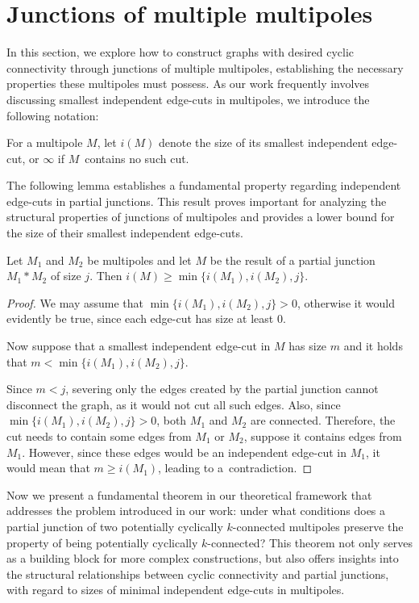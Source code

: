 \documentclass[12pt, twoside]{book}
\begin{document}
\section{Junctions of multiple multipoles}\label{sec:junction-multiple-results}

In this section, we explore how to construct graphs with desired cyclic connectivity through junctions of multiple multipoles, establishing the necessary properties these multipoles must possess. As our work frequently involves discussing smallest independent edge-cuts in multipoles, we introduce the following notation:

\begin{definition}
	For a multipole $M$, let $i(M)$ denote the size of its smallest independent edge-cut, or $\infty$ if $M$~contains no such cut.
\end{definition}

The following lemma establishes a fundamental property regarding independent edge-cuts in partial junctions. This result proves important for analyzing the structural properties of junctions of multipoles and provides a lower bound for the size of their smallest independent edge-cuts.

\begin{lemma}\label{lem:size-of-minimal-independent-after-junction}
	Let $M_1$ and $M_2$ be multipoles and let $M$ be the result of a partial junction $M_1*M_2$ of size $j$. Then $i(M)\geq \min\{i(M_1),i(M_2),j\}$.
\end{lemma}

\begin{proof}
	We may assume that $\min\{i(M_1),i(M_2),j\}>0$, otherwise it would evidently be true, since each edge-cut has size at least 0.
	
	Now suppose that a smallest independent edge-cut in $M$ has size $m$ and it holds that ${m<\min\{i(M_1),i(M_2),j\}}$.
	
	Since $m<j$, severing only the edges created by the partial junction cannot disconnect the graph, as it would not cut all such edges. Also, since ${\min\{i(M_1),i(M_2),j\}>0}$, both $M_1$ and $M_2$ are connected. Therefore, the cut needs to contain some edges from $M_1$ or $M_2$, suppose it contains edges from $M_1$. However, since these edges would be an independent edge-cut in $M_1$, it would mean that $m\geq i(M_1)$, leading to a~contradiction.
\end{proof}

Now we present a fundamental theorem in our theoretical framework that addresses the problem introduced in our work: under what conditions does a partial junction of two potentially cyclically $k$-connected multipoles preserve the property of being potentially cyclically $k$-connected? This theorem not only serves as a building block for more complex constructions, but also offers insights into the structural relationships between cyclic connectivity and partial junctions, with regard to sizes of minimal independent edge-cuts in multipoles.
\end{document}
